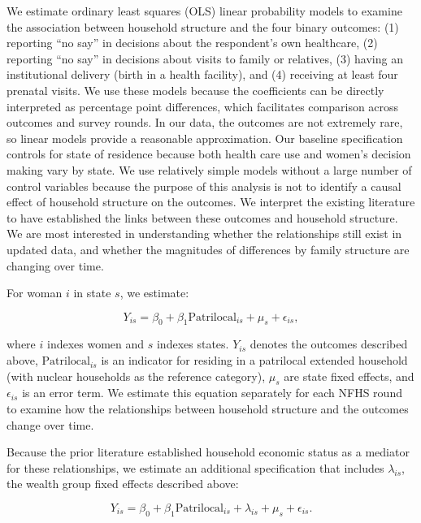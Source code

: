 \documentclass[10pt,twoside,reqno]{article}
\begin{document}
We estimate ordinary least squares (OLS) linear probability models to examine the association between household structure and the four binary outcomes: (1) reporting ``no say'' in decisions about the respondent's own healthcare, (2) reporting ``no say'' in decisions about visits to family or relatives, (3) having an institutional delivery (birth in a health facility), and (4) receiving at least four prenatal visits. We use these models because the coefficients can be directly interpreted as percentage point differences, which facilitates comparison across outcomes and survey rounds. In our data, the outcomes are not extremely rare, so linear models provide a reasonable approximation.  Our baseline specification controls for state of residence because both health care use and women's decision making vary by state.
We use relatively simple models without a large number of control variables because the purpose of this analysis is not to identify a causal effect of household structure on the outcomes.  We interpret the existing literature to have established the links between these outcomes and household structure.  We are most interested in understanding whether the relationships still exist in updated data, and whether the magnitudes of differences by family structure are changing over time.

For woman $i$ in state $s$, we estimate:

\begin{equation} \label{eq:nocontrols}
Y_{is} = \beta_0 + \beta_1 \text{Patrilocal}_{is} + \mu_s + \epsilon_{is},
\end{equation}

where $i$ indexes women and $s$ indexes states. $Y_{is}$ denotes the outcomes described above, $\text{Patrilocal}_{is}$ is an indicator for residing in a patrilocal extended household (with nuclear households as the reference category), $\mu_s$ are state fixed effects, and $\epsilon_{is}$ is an error term. We estimate this equation separately for each NFHS round to examine how the relationships between household structure and the outcomes change over time.

Because the prior literature established household economic status as a mediator for these relationships, we estimate an additional specification that includes $\lambda_{is}$, the wealth group fixed effects described above:

\begin{equation} \label{eq:controls}
Y_{is} = \beta_0 + \beta_1 \text{Patrilocal}_{is} + \lambda_{is} + \mu_s + \epsilon_{is}.
\end{equation}
\end{document}
